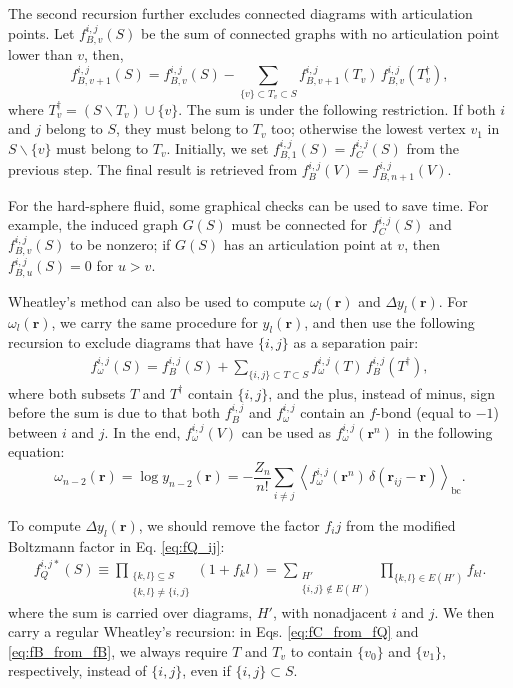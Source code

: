\documentclass[aip,jcp,preprint,superscriptaddress,showpacs,preprintnumbers,amsmath,amssymb]{revtex4-1}
\numberwithin{equation}{section}
\newcommand{\vct}[1]{\mathbf{#1}}
\providecommand{\vr}{} %
\renewcommand{\vr}{\vct{r}}
\begin{document}
The second recursion further excludes connected diagrams
with articulation points.
%
Let $f_{B,v}^{i,j}(S)$ be the sum of connected graphs
with no articulation point lower than $v$,
then\cite{wheatley2013},
%
%
%
\begin{equation}
f_{B,v+1}^{i,j}(S)
=
f_{B,v}^{i,j}(S)
-
\sum_{\{v\} \subset T_v \subset S}
f_{B, v+1}^{i,j}(T_v)
\,
f_{B,v}^{i,j}(T_v^\dagger),
\label{eq:fB_from_fB}
\end{equation}
%
%
%
where
$T_v^\dagger = \left(S \backslash T_v\right) \cup \{v\}$.
%
The sum is under the following restriction.
%
If both $i$ and $j$ belong to $S$,
they must belong to $T_v$ too;
otherwise the lowest vertex $v_1$ in $S \backslash \{v\}$
must belong to $T_v$.
%
Initially,
we set $f_{B,1}^{i,j}(S) = f_C^{i,j}(S)$
from the previous step.
%
The final result is retrieved from
$f_B^{i,j}(V) = f_{B, n+1}^{i,j}(V)$.



For the hard-sphere fluid,
some graphical checks\cite{zhang2014}
can be used to save time.
%
For example,
the induced graph $G(S)$ must be connected for
$f_C^{i,j}(S)$ and $f_{B,v}^{i,j}(S)$
to be nonzero;
%
if $G(S)$ has an articulation point at $v$,
then $f_{B,u}^{i,j}(S) = 0$ for $u > v$.



Wheatley's method can also be used to compute
$\omega_l(\vr)$ and $\Delta y_l(\vr)$.
%
For $\omega_l(\vr)$,
we carry the same procedure for $y_l(\vr)$,
and then use the following recursion to
exclude diagrams that have $\{i, j\}$
as a separation pair:
%
\begin{align*}
f_\omega^{i,j}(S)
=
f_B^{i,j}(S)
+
\sum_{\{i,j\} \subset T \subset S}
f_\omega^{i,j}(T) \, f_B^{i,j}(T^\dagger),
\end{align*}
%
where both subsets $T$ and $T^\dagger$
contain $\{i, j\}$,
and the plus, instead of minus,
sign before the sum is due to that
both $f_B^{i,j}$ and $f_\omega^{i,j}$
contain an $f$-bond (equal to $-1$)
between $i$ and $j$.
%
In the end,
$f_\omega^{i,j}(V)$
can be used as $f_\omega^{i,j}(\vr^n)$
in the following equation:
%
%
%
\[
\omega_{n-2}(\vr)
=
\log y_{n-2}(\vr)
=
- \frac{Z_n}{n!}
\sum_{i\ne j}
  \left\langle
    f_\omega^{i,j}(\vr^n) \, \delta(\vr_{ij} - \vr)
  \right\rangle_\mathrm{bc}.
\]



To compute $\Delta y_l(\vr)$,
we should remove the factor $f_ij$
from the modified Boltzmann factor in Eq. \eqref{eq:fQ_ij}:
%
%
%
\begin{align*}
f_Q^{i,j*}(S)
\equiv
\prod_{\substack{
\{k,l\} \subseteq S \\
\{k,l\} \ne \{i, j\}
}}
  (1 + f_kl)
=
\sum_{\substack{
H' \\
\{i,j\} \notin E(H')
}}
\prod_{\{k,l\} \in E(H')}
f_{kl}.
\end{align*}
%
%
%
where the sum is carried over diagrams, $H'$,
with nonadjacent $i$ and $j$.
%
We then carry a regular Wheatley's recursion:
in Eqs. \eqref{eq:fC_from_fQ} and \eqref{eq:fB_from_fB},
we always require $T$ and $T_v$
to contain $\{v_0\}$ and $\{v_1\}$, respectively,
instead of $\{i, j\}$,
even if $\{i, j\} \subset S$.
\end{document}
